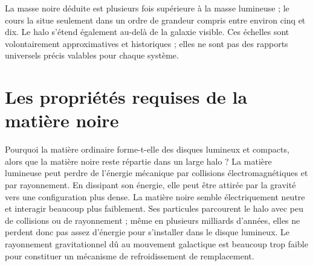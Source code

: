 La masse noire déduite est plusieurs fois supérieure à la masse lumineuse ; le cours la situe seulement dans un ordre de grandeur compris entre environ cinq et dix. Le halo s’étend également au-delà de la galaxie visible. Ces échelles sont volontairement approximatives et historiques ; elles ne sont pas des rapports universels précis valables pour chaque système.

\section{Les propriétés requises de la matière noire}

Pourquoi la matière ordinaire forme-t-elle des disques lumineux et compacts, alors que la matière noire reste répartie dans un large halo ? La matière lumineuse peut perdre de l’énergie mécanique par collisions électromagnétiques et par rayonnement. En dissipant son énergie, elle peut être attirée par la gravité vers une configuration plus dense. La matière noire semble électriquement neutre et interagir beaucoup plus faiblement. Ses particules parcourent le halo avec peu de collisions ou de rayonnement ; même en plusieurs milliards d’années, elles ne perdent donc pas assez d’énergie pour s’installer dans le disque lumineux. Le rayonnement gravitationnel dû au mouvement galactique est beaucoup trop faible pour constituer un mécanisme de refroidissement de remplacement.

\begin{classroomqa}
\end{classroomqa}

\begin{classroomqa}
\end{classroomqa}

